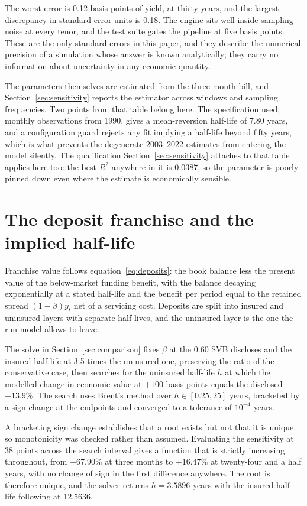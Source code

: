 The worst error is 0.12 basis points of yield, at thirty years, and the largest
discrepancy in standard-error units is 0.18. The engine sits well inside sampling
noise at every tenor, and the test suite gates the pipeline at five basis points.
These are the only standard errors in this paper, and they describe the numerical
precision of a simulation whose answer is known analytically; they carry no
information about uncertainty in any economic quantity.

The parameters themselves are estimated from the three-month bill, and
Section~\ref{sec:sensitivity} reports the estimator across windows and sampling
frequencies. Two points from that table belong here. The specification used, monthly
observations from 1990, gives a mean-reversion half-life of 7.80 years, and a
configuration guard rejects any fit implying a half-life beyond fifty years, which is
what prevents the degenerate 2003--2022 estimates from entering the model silently.
The qualification Section~\ref{sec:sensitivity} attaches to that table applies here
too: the best $R^2$ anywhere in it is 0.0387, so the parameter is poorly pinned down
even where the estimate is economically sensible.

\section{The deposit franchise and the implied half-life}
\label{app:deposits}

Franchise value follows equation~\eqref{eq:deposits}: the book balance less the
present value of the below-market funding benefit, with the balance decaying
exponentially at a stated half-life and the benefit per period equal to the retained
spread $(1-\beta) y_t$ net of a servicing cost. Deposits are split into insured and
uninsured layers with separate half-lives, and the uninsured layer is the one the run
model allows to leave.

The solve in Section~\ref{sec:comparison} fixes $\beta$ at the 0.60 SVB discloses and
the insured half-life at 3.5 times the uninsured one, preserving the ratio of the
conservative case, then searches for the uninsured half-life $h$ at which the modelled
change in economic value at $+100$ basis points equals the disclosed $-13.9\%$. The
search uses Brent's method over $h \in [0.25, 25]$ years, bracketed by a sign change
at the endpoints and converged to a tolerance of $10^{-4}$ years.

A bracketing sign change establishes that a root exists but not that it is unique, so
monotonicity was checked rather than assumed. Evaluating the sensitivity at 38 points
across the search interval gives a function that is strictly increasing throughout,
from $-67.90\%$ at three months to $+16.47\%$ at twenty-four and a half years, with no
change of sign in the first difference anywhere. The root is therefore unique, and
the solver returns $h = 3.5896$ years with the insured half-life following at
12.5636.

